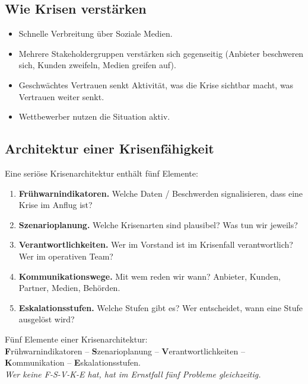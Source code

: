 \documentclass[11pt,a4paper,oneside]{article}
\newcommand{\caveatfontfallback}{\itshape}
\newcommand\caveatfont{\caveatfontfallback}%
\newcommand{\akzent}[1]{{\caveatfont\color{lpAmber}#1}}
\newcommand{\fachbegriff}[1]{\textbf{#1}}
\begin{document}
\subsection{Wie Krisen verstärken}

\begin{itemize}
  \item Schnelle Verbreitung über Soziale Medien.
  \item Mehrere Stakeholdergruppen verstärken sich gegenseitig (Anbieter beschweren sich, Kunden zweifeln, Medien greifen auf).
  \item Geschwächtes Vertrauen senkt Aktivität, was die Krise sichtbar macht, was Vertrauen weiter senkt.
  \item Wettbewerber nutzen die Situation aktiv.
\end{itemize}

\subsection{Architektur einer Krisenfähigkeit}

Eine seriöse Krisenarchitektur enthält fünf Elemente:

\begin{enumerate}
  \item \fachbegriff{Frühwarnindikatoren.} Welche Daten / Beschwerden signalisieren, dass eine Krise im Anflug ist?
  \item \fachbegriff{Szenarioplanung.} Welche Krisenarten sind plausibel? Was tun wir jeweils?
  \item \fachbegriff{Verantwortlichkeiten.} Wer im Vorstand ist im Krisenfall verantwortlich? Wer im operativen Team?
  \item \fachbegriff{Kommunikationswege.} Mit wem reden wir wann? Anbieter, Kunden, Partner, Medien, Behörden.
  \item \fachbegriff{Eskalationsstufen.} Welche Stufen gibt es? Wer entscheidet, wann eine Stufe ausgelöst wird?
\end{enumerate}

\begin{eselsbox}[Eselsbrücke: \akzent{F-S-V-K-E}]
Fünf Elemente einer Krisenarchitektur:\\[2pt]
\textbf{F}rühwarnindikatoren -- \textbf{S}zenarioplanung -- \textbf{V}erantwortlichkeiten -- \textbf{K}ommunikation -- \textbf{E}skalationsstufen.\\[2pt]
\emph{Wer keine F-S-V-K-E hat, hat im Ernstfall fünf Probleme gleichzeitig.}
\end{eselsbox}
\end{document}
